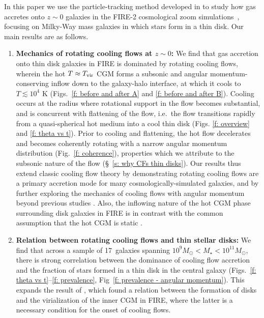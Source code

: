 \documentclass[fleqn,usenatbib]{mnras}
\newcommand{\Nsample}{17}
\begin{document}
In this paper we use the particle-tracking method developed in \cite{Hafen2019,Hafen2020} to study how gas accretes onto $z\sim0$ galaxies in the FIRE-2 cosmological zoom simulations~\citep{Hopkins2018}, focusing on Milky-Way mass galaxies in which stars form in a thin disk. 
Our main results are as follows.
\begin{enumerate}
    \item \textbf{Mechanics of rotating cooling flows at $z \sim 0$:}
    We find that gas accretion onto thin disk galaxies in FIRE is dominated by rotating cooling flows, wherein the hot $T\approx T_{\rm vir}$ CGM forms a subsonic and angular momentum-conserving inflow down to the galaxy-halo interface, at which it cools to $T\lesssim10^4$ K (Figs.~\ref{f: before and after A} and \ref{f: before and after B}).
    Cooling occurs at the radius where rotational support in the flow becomes substantial, and is concurrent with flattening of the flow, i.e.~the flow transitions rapidly from a quasi-spherical hot medium into a cool thin disk (Figs. \ref{f: overview} and \ref{f: theta vs t}).
    Prior to cooling and flattening, the hot flow decelerates and becomes coherently rotating with a narrow angular momentum distribution (Fig.~\ref{f: coherence}), properties which we attribute to the subsonic nature of the flow (\S~\ref{s: why CFs thin disks}).
    Our results thus extend classic cooling flow theory by demonstrating rotating cooling flows are a primary accretion mode for many cosmologically-simulated galaxies, and by further exploring the mechanics of cooling flows with angular momentum beyond previous studies \citep{Cowie1980, Stern2020}.
    Also, the inflowing nature of the hot CGM phase surrounding disk galaxies in FIRE is in contrast with the common assumption that the hot CGM is static  \citep[e.g.,][]{Maller2004,Sharma2012, Voit2017, Faerman2017,Faerman2020}. 
    \item \textbf{Relation between rotating cooling flows and thin stellar disks:}
    We find that across a sample of \Nsample~galaxies spanning $10^9 M_\odot < M_\star < 10^{11} M_\odot$, there is strong correlation between the dominance of cooling flow accretion and the fraction of stars formed in a thin disk in the central galaxy (Figs.~\ref{f: theta vs t}--\ref{f: prevalence}, Fig~\ref{f: prevalence - angular momentum}).
    This expands the result of \cite{Stern2021}, which found a relation between the formation of disks and the virialization of the inner CGM in FIRE, where the latter is a necessary condition for the onset of cooling flows. 

\end{enumerate}
\end{document}

